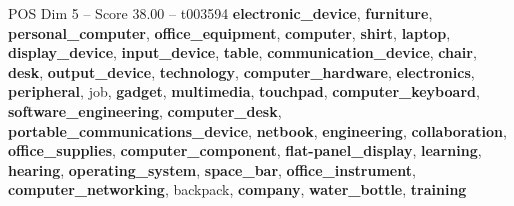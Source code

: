 \begin{textsample}{POS Dim 5 – Score 38.00 – t003594}  \label{ex:f5_pos_006}
\textbf{electronic\_device}, \textbf{furniture}, \textbf{personal\_computer}, \textbf{office\_equipment}, \textbf{computer}, \textbf{shirt}, \textbf{laptop}, \textbf{display\_device}, \textbf{input\_device}, \textbf{table}, \textbf{communication\_device}, \textbf{chair}, \textbf{desk}, \textbf{output\_device}, \textbf{technology}, \textbf{computer\_hardware}, \textbf{electronics}, \textbf{peripheral}, job, \textbf{gadget}, \textbf{multimedia}, \textbf{touchpad}, \textbf{computer\_keyboard}, \textbf{software\_engineering}, \textbf{computer\_desk}, \textbf{portable\_communications\_device}, \textbf{netbook}, \textbf{engineering}, \textbf{collaboration}, \textbf{office\_supplies}, \textbf{computer\_component}, \textbf{flat-panel\_display}, \textbf{learning}, \textbf{hearing}, \textbf{operating\_system}, \textbf{space\_bar}, \textbf{office\_instrument}, \textbf{computer\_networking}, backpack, \textbf{company}, \textbf{water\_bottle}, \textbf{training}

\end{textsample}
